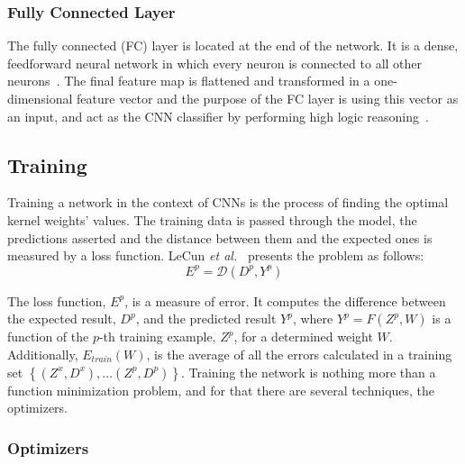 \documentclass[class=report, crop=false, a4paper, 12pt]{standalone}
\begin{document}
\subsubsection{Fully Connected Layer}
The fully connected (FC) layer is located at the end of the network. It is a dense, feedforward neural network in which every neuron is connected to all other neurons~\autocite{yamashitaConvolutionalNeuralNetworks2018, alzubaidiReviewDeepLearning2021}. The final feature map is flattened and transformed in a one-dimensional feature vector and the purpose of the FC layer is using this vector as an input, and act as the CNN classifier by performing high logic reasoning~\autocite{guRecentAdvancesConvolutional2018}.

\subsection{Training}
Training a network in the context of CNNs is the process of finding the optimal kernel weights' values. The training data is passed through the model, the predictions asserted and the distance between them and the expected ones is measured by a loss function. LeCun \textit{et al.}~\autocite{lecunGradientBasedLearningApplied1998} presents the problem as follows:
\begin{equation}
    E^p = \mathcal{D}(D^p, Y^p)
\end{equation}

\noindent The loss function, $E^p$, is a measure of error. It computes the difference between the expected result, $D^p$, and the predicted result $Y^p$, where $Y^p = F(Z^p, W)$ is a function of the $p$-th training example, $Z^p$, for a determined weight $W$. Additionally, $E_{train}(W)$, is the average of all the errors calculated in a training set $\left\{(Z^x, D^x),\dots (Z^p, D^p)\right\}$. Training the network is nothing more than a function minimization problem, and for that there are several techniques, the optimizers.

\subsubsection{Optimizers}

\end{document}
